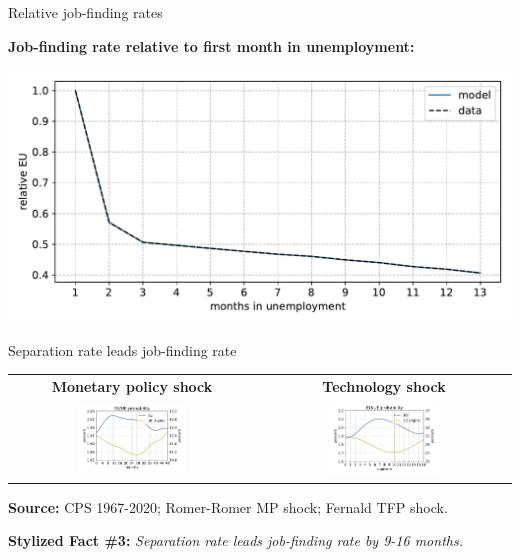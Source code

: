 \documentclass[aspectratio=169]{beamer}
\begin{document}
\begin{frame}{Relative job-finding rates}
\label{slide:rel_job_finding}

\begin{center}
\textbf{Job-finding rate relative to first month in unemployment:}

	\includegraphics[width=0.9\linewidth]{results/UEs}
\end{center}

\hyperlink{slide:calibration}{}
\end{frame}

\begin{frame}{Separation rate leads job-finding rate}
\label{slide:dyn_job_finding_seprations}

\begin{center}
\begin{tabular}{cc}
\textbf{Monetary policy shock} & \textbf{Technology shock}\tabularnewline
\textbf{\small{}\includegraphics[width=0.45\textwidth]{results/monetary_shock_lead_lag}} & \textbf{\small{}\includegraphics[width=0.45\textwidth]{results/technology_shock_lead_lag}}\tabularnewline
\end{tabular}

\textbf{\footnotesize{}Source: }{\footnotesize{}CPS 1967-2020; Romer-Romer
MP shock; Fernald TFP shock}.\vspace{3mm}
\end{center}




\textbf{Stylized Fact \#3:} \emph{Separation rate leads job-finding rate by 9-16 months.}
\end{frame}
\end{document}
